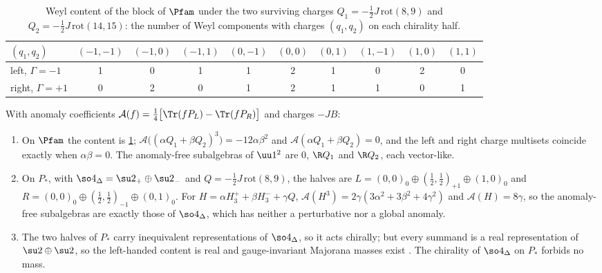 \begin{table}[t]
\centering
\small
\begin{tabular}{@{}lccccccccc@{}}
\toprule
$(q_1,q_2)$ & $(-1,-1)$ & $(-1,0)$ & $(-1,1)$ & $(0,-1)$ & $(0,0)$ & $(0,1)$ & $(1,-1)$ & $(1,0)$ & $(1,1)$\\
\midrule
left, $\Gamma=-1$ & 1 & 0 & 1 & 1 & 2 & 1 & 0 & 2 & 0\\
right, $\Gamma=+1$ & 0 & 2 & 0 & 1 & 2 & 1 & 1 & 0 & 1\\
\bottomrule
\end{tabular}
\caption{Weyl content of the block of $\Pfam$ under the two surviving charges $Q_1=-\tfrac12J\,\mathrm{rot}(8,9)$ and $Q_2=-\tfrac12J\,\mathrm{rot}(14,15)$:
the number of Weyl components with charges $(q_1,q_2)$ on each chirality half.}
\label{tab:closurecontent}
\end{table}

\begin{theorem}
\label{thm:closurechiral}
With anomaly coefficients $\mathcal A(f)=\tfrac14\bigl[\Tr(fP_L)-\Tr(fP_R)\bigr]$ and charges $-JB$:
\begin{enumerate}[label=(\roman*),leftmargin=2.2em]
\item On $\Pfam$ the content is \cref{tab:closurecontent}; $\mathcal A\bigl((\alpha Q_1+\beta Q_2)^3\bigr)=-12\alpha\beta^2$ and $\mathcal A(\alpha Q_1+\beta Q_2)=0$, and
the left and right charge multisets coincide exactly when $\alpha\beta=0$. The anomaly-free subalgebras of $\uu1^2$ are $0$, $\R Q_1$ and $\R Q_2$,
each vector-like.
\item On $P_*$, with $\so4_\Delta=\su2_+\oplus\su2_-$ and $Q=-\tfrac12J\,\mathrm{rot}(8,9)$, the halves are
$L=(0,0)_0\oplus(\tfrac12,\tfrac12)_{+1}\oplus(1,0)_0$ and $R=(0,0)_0\oplus(\tfrac12,\tfrac12)_{-1}\oplus(0,1)_0$. For $H=\alpha H^+_3+\beta H^-_3+\gamma Q$,
$\mathcal A(H^3)=2\gamma(3\alpha^2+3\beta^2+4\gamma^2)$ and $\mathcal A(H)=8\gamma$, so the anomaly-free subalgebras are exactly those of $\so4_\Delta$, which
has neither a perturbative nor a global anomaly.
\item The two halves of $P_*$ carry inequivalent representations of $\so4_\Delta$, so it acts chirally; but every summand is a real representation
of $\su2\oplus\su2$, so the left-handed content is real and gauge-invariant Majorana masses exist \cite{Suzuki2000}. The chirality of $\so4_\Delta$
on $P_*$ forbids no mass.
\end{enumerate}
\end{theorem}

